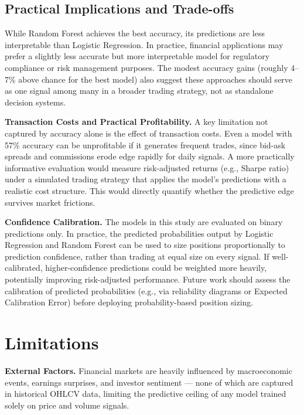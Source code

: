\documentclass{article}
\begin{document}
\subsection{Practical Implications and Trade-offs}

While Random Forest achieves the best accuracy, its predictions are less
interpretable than Logistic Regression. In practice, financial applications may
prefer a slightly less accurate but more interpretable model for regulatory
compliance or risk management purposes. The modest accuracy gains (roughly 4--7\%
above chance for the best model) also suggest these approaches should serve as
one signal among many in a broader trading strategy, not as standalone decision
systems.

\textbf{Transaction Costs and Practical Profitability.} A key limitation not
captured by accuracy alone is the effect of transaction costs. Even a model
with 57\% accuracy can be unprofitable if it generates frequent trades, since
bid-ask spreads and commissions erode edge rapidly for daily signals. A more
practically informative evaluation would measure risk-adjusted returns (e.g.,
Sharpe ratio) under a simulated trading strategy that applies the model's
predictions with a realistic cost structure. This would directly quantify
whether the predictive edge survives market frictions.

\textbf{Confidence Calibration.} The models in this study are evaluated on
binary predictions only. In practice, the predicted probabilities output by
Logistic Regression and Random Forest can be used to size positions
proportionally to prediction confidence, rather than trading at equal size on
every signal. If well-calibrated, higher-confidence predictions could be
weighted more heavily, potentially improving risk-adjusted performance. Future
work should assess the calibration of predicted probabilities (e.g., via
reliability diagrams or Expected Calibration Error) before deploying
probability-based position sizing.

\section{Limitations}

\textbf{External Factors.} Financial markets are heavily influenced by
macroeconomic events, earnings surprises, and investor sentiment --- none of
which are captured in historical OHLCV data, limiting the predictive ceiling of
any model trained solely on price and volume signals.
\end{document}
